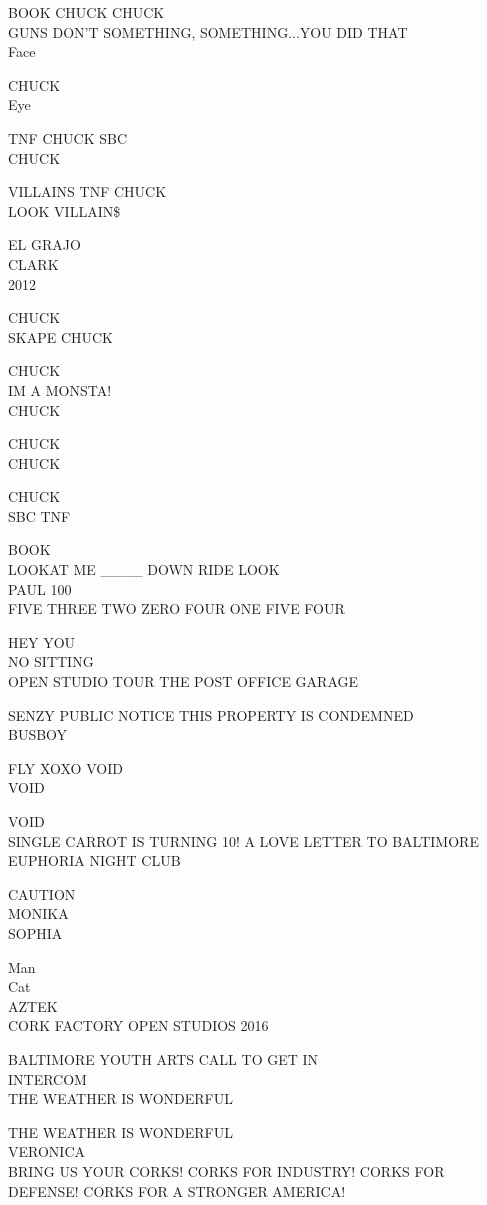 \documentclass[10pt,letterpaper]{article}
\begin{document}
BOOK CHUCK CHUCK\\
GUNS DON'T SOMETHING, SOMETHING...YOU DID THAT\\
Face

CHUCK\\
Eye

TNF CHUCK SBC\\
CHUCK

VILLAINS TNF CHUCK\\
LOOK VILLAIN\$

EL GRAJO\\
CLARK\\
2012

CHUCK\\
SKAPE CHUCK

CHUCK\\
IM A MONSTA!\\
CHUCK

CHUCK\\
CHUCK

CHUCK\\
SBC TNF

BOOK\\
LOOKAT ME \_\_\_\_ DOWN RIDE LOOK\\
PAUL 100\\
FIVE THREE TWO ZERO FOUR ONE FIVE FOUR

HEY YOU\\
NO SITTING\\
OPEN STUDIO TOUR THE POST OFFICE GARAGE

SENZY PUBLIC NOTICE THIS PROPERTY IS CONDEMNED\\
BUSBOY

FLY XOXO VOID\\
VOID

VOID\\
SINGLE CARROT IS TURNING 10! A LOVE LETTER TO BALTIMORE\\
EUPHORIA NIGHT CLUB

CAUTION\\
MONIKA\\
SOPHIA

Man\\
Cat\\
AZTEK\\
CORK FACTORY OPEN STUDIOS 2016

BALTIMORE YOUTH ARTS CALL TO GET IN\\
INTERCOM\\
THE WEATHER IS WONDERFUL

THE WEATHER IS WONDERFUL\\
VERONICA\\
BRING US YOUR CORKS!  CORKS FOR INDUSTRY!  CORKS FOR DEFENSE!  CORKS FOR A STRONGER AMERICA!
\end{document}
